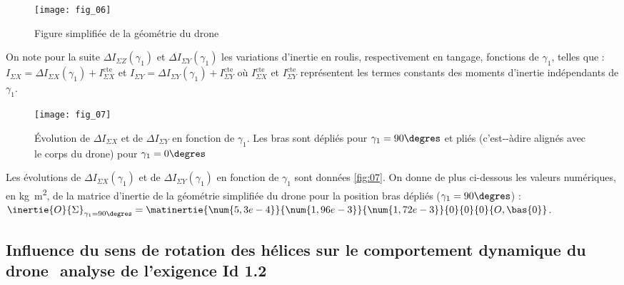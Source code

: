 \begin{figure}[H]
\centering
\texttt{[image: fig\_06]}
\caption{\label{fig:06}  Figure simplifiée de la géométrie du drone}
\end{figure}

On note pour la suite $\Delta I_{\Sigma Z} (\gamma_1)$ et $\Delta I_{\Sigma Y} (\gamma_1)$  les variations d’inertie en roulis, respectivement en tangage, fonctions de $\gamma_1$, 
telles que : $I_{\Sigma X} = \Delta I_{\Sigma X} (\gamma_1) + I_{\Sigma X}^{\text{cte}}$ 
et 
$I_{\Sigma Y} = \Delta I_{\Sigma Y} (\gamma_1) + I_{\Sigma Y}^{\text{cte}}$ 
où $I_{\Sigma X}^{\text{cte}}$ et $I_{\Sigma Y}^{\text{cte}}$
représentent les termes constants des moments d’inertie indépendants de $\gamma_1$.


\begin{figure}[H]
\centering
\texttt{[image: fig\_07]}
\caption{\label{fig:07}  Évolution de $\Delta I_{\Sigma X}$ et de $\Delta I_{\Sigma Y}$ en fonction de $\gamma_1$. Les bras sont dépliés pour $\gamma_1 = 90\degres$
et pliés (c’est-­-à­dire alignés avec le corps du drone) pour $\gamma_1 = 0\degres$}
\end{figure}

Les évolutions de $\Delta I_{\Sigma X} (\gamma_1)$ et de $\Delta I_{\Sigma Y} (\gamma_1)$ en fonction de $\gamma_1$ sont données \autoref{fig:07}. On donne
de plus ci-­dessous les valeurs numériques, en \si{kg.m^2}, de la matrice d’inertie de la géométrie
simplifiée du drone pour la position bras dépliés ($\gamma_1 = 90\degres$) :
$\inertie{O}{\Sigma}_{\gamma_1 = 90\degres} = \matinertie{\num{5,3e-4}}{\num{1,96e-3}}{\num{1,72e-3}}{0}{0}{0}{O,\bas{0}}$.

\ifprof
\begin{corrige}
\end{corrige}
\else
\fi

\subsection{Influence du sens de rotation des hélices sur le comportement dynamique du
drone ­ analyse de l’exigence Id 1.2}

